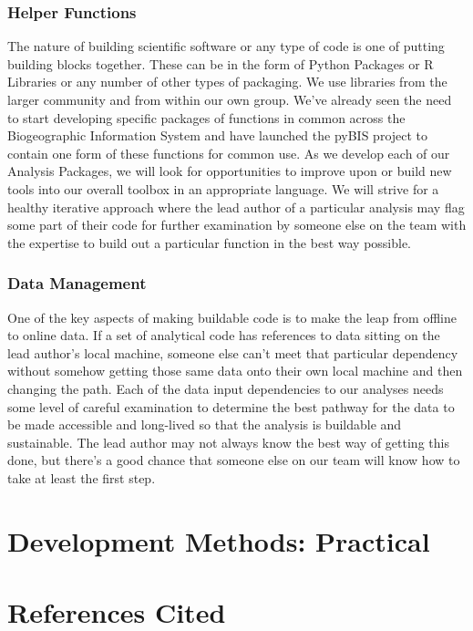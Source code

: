 \documentclass[letterpaper,10pt,english]{sphinxmanual}
\begin{document}
\subsection{Helper Functions}
\label{\detokenize{devmethods:helper-functions}}
The nature of building scientific software or any type of code is one of putting building blocks together. These can be in the form of Python Packages or R Libraries or any number of other types of packaging. We use libraries from the larger community and from within our own group. We’ve already seen the need to start developing specific packages of functions in common across the Biogeographic Information System and have launched the pyBIS project to contain one form of these functions for common use. As we develop each of our Analysis Packages, we will look for opportunities to improve upon or build new tools into our overall toolbox in an appropriate language. We will strive for a healthy iterative approach where the lead author of a particular analysis may flag some part of their code for further examination by someone else on the team with the expertise to build out a particular function in the best way possible.


\subsection{Data Management}
\label{\detokenize{devmethods:data-management}}
One of the key aspects of making buildable code is to make the leap from offline to online data. If a set of analytical code has references to data sitting on the lead author’s local machine, someone else can’t meet that particular dependency without somehow getting those same data onto their own local machine and then changing the path. Each of the data input dependencies to our analyses needs some level of careful examination to determine the best pathway for the data to be made accessible and long-lived so that the analysis is buildable and sustainable. The lead author may not always know the best way of getting this done, but there’s a good chance that someone else on our team will know how to take at least the first step.


\chapter{Development Methods: Practical}
\label{\detokenize{devmethods:development-methods-practical}}

\chapter{References Cited}
\label{\detokenize{references:references-cited}}\label{\detokenize{references::doc}}
\end{document}

